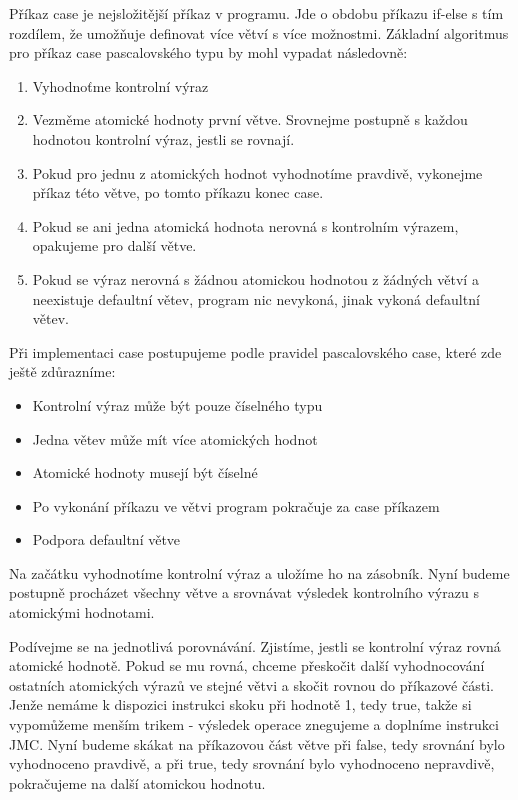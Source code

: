 \documentclass[
12pt,
a4paper,
pdftex,
czech,
titlepage
]{report}
\begin{document}
Příkaz case je nejsložitější příkaz v programu. Jde o obdobu příkazu if-else s tím rozdílem, že umožňuje definovat více větví s více možnostmi. Základní algoritmus pro příkaz case pascalovského typu by mohl vypadat následovně:
\begin{enumerate}
\item Vyhodnoťme kontrolní výraz
\item Vezměme atomické hodnoty první větve. Srovnejme postupně s každou hodnotou kontrolní výraz, jestli se rovnají.
\item Pokud pro jednu z atomických hodnot vyhodnotíme pravdivě, vykonejme příkaz této větve, po tomto příkazu konec case. 
\item Pokud se ani jedna atomická hodnota nerovná s kontrolním výrazem, opakujeme pro další větve.
\item Pokud se výraz nerovná s žádnou atomickou hodnotou z žádných větví a neexistuje defaultní větev, program nic nevykoná, jinak vykoná defaultní větev.
\end{enumerate}

Při implementaci case postupujeme podle pravidel pascalovského case, které zde ještě zdůrazníme:
\begin{itemize}
\item Kontrolní výraz může být pouze číselného typu
\item Jedna větev může mít více atomických hodnot
\item Atomické hodnoty musejí být číselné
\item Po vykonání příkazu ve větvi program pokračuje za case příkazem
\item Podpora defaultní větve
\end{itemize}

Na začátku vyhodnotíme kontrolní výraz a uložíme ho na zásobník. Nyní budeme postupně procházet všechny větve a srovnávat výsledek kontrolního výrazu s atomickými hodnotami. 

Podívejme se na jednotlivá porovnávání. Zjistíme, jestli se kontrolní výraz rovná atomické hodnotě. Pokud se mu rovná, chceme přeskočit další vyhodnocování ostatních atomických výrazů ve stejné větvi a skočit rovnou do příkazové části. Jenže nemáme k dispozici instrukci skoku při hodnotě 1, tedy true, takže si vypomůžeme menším trikem - výsledek operace znegujeme a doplníme instrukci JMC. Nyní budeme skákat na příkazovou část větve při false, tedy srovnání bylo vyhodnoceno pravdivě, a při true, tedy srovnání bylo vyhodnoceno nepravdivě, pokračujeme na další atomickou hodnotu. 
\end{document}
